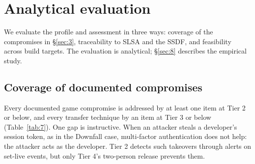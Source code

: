 \documentclass[acmsmall,screen,review]{acmart}
\begin{document}
\section{Analytical evaluation}\label{sec:7}

We evaluate the profile and assessment in three ways: coverage of the compromises in \S\ref{sec:3}, traceability to SLSA and the SSDF, and feasibility across build targets. The evaluation is analytical; \S\ref{sec:8} describes the empirical study.


\subsection{Coverage of documented compromises}\label{sec:7.1}

Every documented game compromise is addressed by at least one item at Tier 2 or below, and every transfer technique by an item at Tier 3 or below (Table~\ref{tab:7}). One gap is instructive. When an attacker steals a developer's session token, as in the Downfall case, multi-factor authentication does not help: the attacker acts as the developer. Tier 2 detects such takeovers through alerts on set-live events, but only Tier 4's two-person release prevents them.
\end{document}
